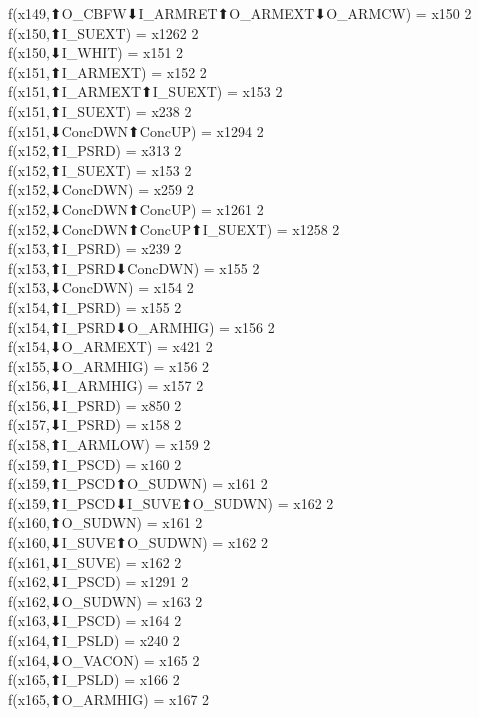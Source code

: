f(x149,⬆O_CBFW⬇I_ARMRET⬆O_ARMEXT⬇O_ARMCW) = x150 {2} \\
f(x150,⬆I_SUEXT) = x1262 {2} \\
f(x150,⬇I_WHIT) = x151 {2} \\
f(x151,⬆I_ARMEXT) = x152 {2} \\
f(x151,⬆I_ARMEXT⬆I_SUEXT) = x153 {2} \\
f(x151,⬆I_SUEXT) = x238 {2} \\
f(x151,⬇ConcDWN⬆ConcUP) = x1294 {2} \\
f(x152,⬆I_PSRD) = x313 {2} \\
f(x152,⬆I_SUEXT) = x153 {2} \\
f(x152,⬇ConcDWN) = x259 {2} \\
f(x152,⬇ConcDWN⬆ConcUP) = x1261 {2} \\
f(x152,⬇ConcDWN⬆ConcUP⬆I_SUEXT) = x1258 {2} \\
f(x153,⬆I_PSRD) = x239 {2} \\
f(x153,⬆I_PSRD⬇ConcDWN) = x155 {2} \\
f(x153,⬇ConcDWN) = x154 {2} \\
f(x154,⬆I_PSRD) = x155 {2} \\
f(x154,⬆I_PSRD⬇O_ARMHIG) = x156 {2} \\
f(x154,⬇O_ARMEXT) = x421 {2} \\
f(x155,⬇O_ARMHIG) = x156 {2} \\
f(x156,⬇I_ARMHIG) = x157 {2} \\
f(x156,⬇I_PSRD) = x850 {2} \\
f(x157,⬇I_PSRD) = x158 {2} \\
f(x158,⬆I_ARMLOW) = x159 {2} \\
f(x159,⬆I_PSCD) = x160 {2} \\
f(x159,⬆I_PSCD⬆O_SUDWN) = x161 {2} \\
f(x159,⬆I_PSCD⬇I_SUVE⬆O_SUDWN) = x162 {2} \\
f(x160,⬆O_SUDWN) = x161 {2} \\
f(x160,⬇I_SUVE⬆O_SUDWN) = x162 {2} \\
f(x161,⬇I_SUVE) = x162 {2} \\
f(x162,⬇I_PSCD) = x1291 {2} \\
f(x162,⬇O_SUDWN) = x163 {2} \\
f(x163,⬇I_PSCD) = x164 {2} \\
f(x164,⬆I_PSLD) = x240 {2} \\
f(x164,⬇O_VACON) = x165 {2} \\
f(x165,⬆I_PSLD) = x166 {2} \\
f(x165,⬆O_ARMHIG) = x167 {2} \\
